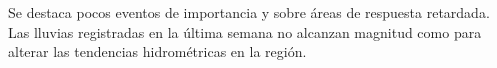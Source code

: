 Se destaca pocos eventos de importancia y sobre áreas de respuesta
retardada. Las lluvias registradas en la última semana no alcanzan
magnitud como para alterar las tendencias hidrométricas en la región.

